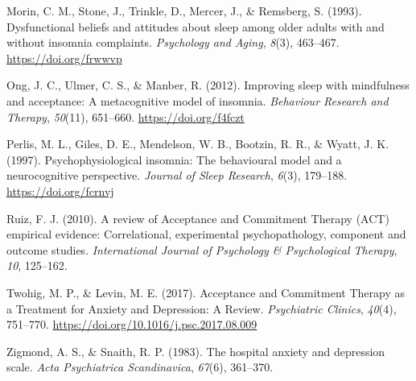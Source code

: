 \documentclass[
  letterpaper,
  DIV=11,
  numbers=noendperiod]{scrreprt}
\newlength{\cslhangindent}
\newlength{\cslentryspacingunit} %
\newenvironment{CSLReferences}[2] %
 {%
  \setlength{\parindent}{0pt}
  \ifodd #1
  \let\oldpar\par
  \def\par{\hangindent=\cslhangindent\oldpar}
  \fi
  \setlength{\parskip}{#2\cslentryspacingunit}
 }%
 {}
\begin{document}
\begin{CSLReferences}{1}{0}
\leavevmode{}%
Morin, C. M., Stone, J., Trinkle, D., Mercer, J., \& Remsberg, S.
(1993). Dysfunctional beliefs and attitudes about sleep among older
adults with and without insomnia complaints. \emph{Psychology and
Aging}, \emph{8}(3), 463--467. \url{https://doi.org/frwwvp}

\leavevmode{}%
Ong, J. C., Ulmer, C. S., \& Manber, R. (2012). Improving sleep with
mindfulness and acceptance: {A} metacognitive model of insomnia.
\emph{Behaviour Research and Therapy}, \emph{50}(11), 651--660.
\url{https://doi.org/f4fczt}

\leavevmode{}%
Perlis, M. L., Giles, D. E., Mendelson, W. B., Bootzin, R. R., \& Wyatt,
J. K. (1997). Psychophysiological insomnia: The behavioural model and a
neurocognitive perspective. \emph{Journal of Sleep Research},
\emph{6}(3), 179--188. \url{https://doi.org/fcrnvj}

\leavevmode{}%
Ruiz, F. J. (2010). A review of {Acceptance} and {Commitment Therapy}
({ACT}) empirical evidence: {Correlational}, experimental
psychopathology, component and outcome studies. \emph{International
Journal of Psychology \& Psychological Therapy}, \emph{10}, 125--162.

\leavevmode{}%
Twohig, M. P., \& Levin, M. E. (2017). Acceptance and {Commitment
Therapy} as a {Treatment} for {Anxiety} and {Depression}: {A Review}.
\emph{Psychiatric Clinics}, \emph{40}(4), 751--770.
\url{https://doi.org/10.1016/j.psc.2017.08.009}

\leavevmode{}%
Zigmond, A. S., \& Snaith, R. P. (1983). The hospital anxiety and
depression scale. \emph{Acta Psychiatrica Scandinavica}, \emph{67}(6),
361--370.

\end{CSLReferences}
\end{document}
